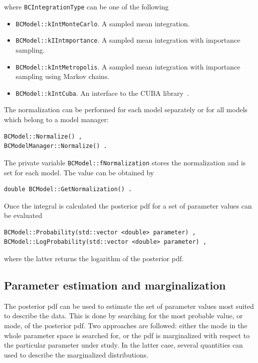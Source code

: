 \documentclass[11pt, a4paper]{article}
\begin{document}
\noindent
where \verb|BCIntegrationType| can be one of the following 
% 
\begin{itemize}
\item \verb|BCModel::kIntMonteCarlo|. A sampled mean integration.
\item \verb|BCModel::kIIntmportance|. A sampled mean integration
 with importance sampling.  
\item \verb|BCModel::kIntMetropolis|. A sampled mean integration
 with importance sampling using Markov chains. 
\item \verb|BCModel::kIntCuba|. An interface to the CUBA
library~\cite{CUBA}.
\end{itemize}

\noindent 
The normalization can be performed for each model separately or for
all models which belong to a model manager:
%
\begin{verbatim}
BCModel::Normalize() ,
BCModelManager::Normalize() .
\end{verbatim} 

\noindent 
The private variable \verb|BCModel::fNormalization| stores the
normalization and is set for each model. The value can be obtained by
%
\begin{verbatim}
double BCModel::GetNormalization() . 
\end{verbatim}

\noindent 
Once the integral is calculated the posterior pdf for a set of
parameter values can be evaluated
%
\begin{verbatim} 
BCModel::Probability(std::vector <double> parameter) , 
BCModel::LogProbability(std::vector <double> parameter) , 
\end{verbatim} 
%
where the latter returns the logarithm of the posterior pdf.


\subsection{Parameter estimation and marginalization} 

The posterior pdf can be used to estimate the set of parameter values
most suited to describe the data. This is done by searching for the
most probable value, or mode, of the posterior pdf. Two approaches are
followed: either the mode in the whole parameter space is searched
for, or the pdf is marginalized with respect to the particular
parameter under study. In the latter case, several quantities can used
to describe the marginalized distributions.
\end{document}
